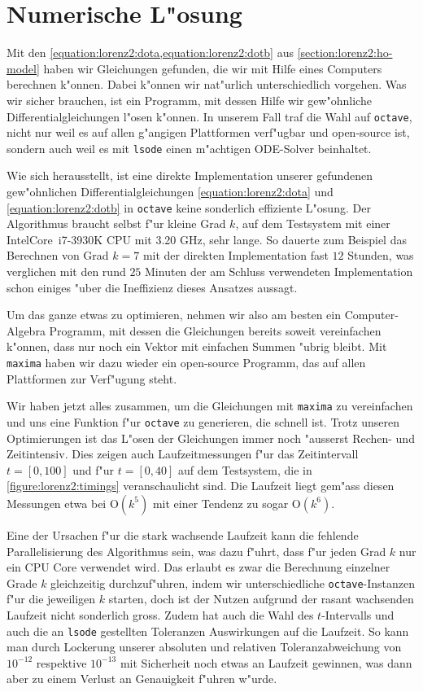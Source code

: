 \section{Numerische L"osung\label{section:lorenz2:numeric-solution}}
Mit den \cref{equation:lorenz2:dota,equation:lorenz2:dotb} aus 
\cref{section:lorenz2:ho-model} haben wir Gleichungen gefunden, die wir mit 
Hilfe eines Computers berechnen k"onnen. Dabei k"onnen wir nat"urlich 
unterschiedlich vorgehen. Was wir sicher brauchen, ist ein Programm, 
mit dessen Hilfe wir gew"ohnliche Differentialgleichungen l"osen k"onnen. In 
unserem Fall traf die Wahl auf \texttt{octave}, nicht nur weil es auf allen 
g"angigen Plattformen verf"ugbar und open-source ist, sondern auch weil es mit 
\texttt{lsode} einen m"achtigen  ODE-Solver beinhaltet.

Wie sich herausstellt, ist eine direkte Implementation unserer gefundenen 
gew"ohnlichen Differentialgleichungen \cref{equation:lorenz2:dota} und 
\cref{equation:lorenz2:dotb} in \texttt{octave} keine sonderlich effiziente 
L"osung. Der Algorithmus braucht selbst f"ur kleine Grad $k$, auf dem 
Testsystem mit einer Intel\textregistered Core\texttrademark\, i7-3930K CPU mit 
3.20 GHz, sehr lange. So dauerte zum Beispiel das Berechnen von Grad $k = 7$ 
mit der direkten Implementation fast $12$ Stunden, was verglichen mit den rund 
$25$ Minuten der am Schluss verwendeten Implementation schon einiges "uber 
die Ineffizienz dieses Ansatzes aussagt.

Um das ganze etwas zu optimieren, nehmen wir also am besten ein 
Computer-Algebra Programm, mit dessen die Gleichungen bereits soweit 
vereinfachen k"onnen, dass nur noch ein Vektor mit einfachen Summen "ubrig 
bleibt. Mit \texttt{maxima} haben wir dazu wieder ein open-source Programm, das 
auf allen Plattformen zur Verf"ugung steht.

Wir haben jetzt alles zusammen, um die Gleichungen mit \texttt{maxima} zu 
vereinfachen und uns eine Funktion f"ur \texttt{octave} zu generieren, die 
schnell ist. Trotz unseren Optimierungen ist das L"osen der 
Gleichungen immer noch "ausserst Rechen- und Zeitintensiv. Dies zeigen auch 
Laufzeitmessungen f"ur das Zeitintervall $t = [0,100]$ und f"ur $t = [0,40]$ 
auf dem Testsystem, die in \cref{figure:lorenz2:timings} veranschaulicht sind. 
Die Laufzeit liegt gem"ass diesen Messungen etwa bei $\text{O}(k^5)$ mit einer 
Tendenz zu sogar $\text{O}(k^6)$.

Eine der Ursachen f"ur die stark wachsende Laufzeit kann die fehlende 
Parallelisierung des Algorithmus sein, was dazu f"uhrt, dass f"ur jeden Grad 
$k$ nur ein CPU Core verwendet wird. Das erlaubt es zwar die Berechnung 
einzelner Grade $k$ gleichzeitig durchzuf"uhren, indem wir unterschiedliche 
\texttt{octave}-Instanzen f"ur die jeweiligen $k$ starten, doch ist der Nutzen 
aufgrund der rasant wachsenden Laufzeit nicht sonderlich gross. Zudem hat auch 
die Wahl des $t$-Intervalls und auch die an \texttt{lsode} gestellten 
Toleranzen Auswirkungen auf die Laufzeit. So kann man durch Lockerung unserer 
absoluten und relativen Toleranzabweichung von $10^{-12}$ respektive $10^{-13}$ 
mit Sicherheit noch etwas an Laufzeit gewinnen, was dann aber zu einem Verlust 
an Genauigkeit f"uhren w"urde.

